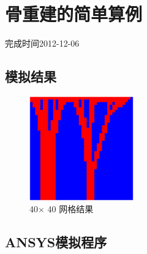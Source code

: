 

\section{骨重建的简单算例}
完成时间2012-12-06
\subsection{模拟结果}
\begin{figure}[htbp]
	\begin{center}
		\includegraphics[width=0.4\textwidth]{pics/40.eps}
	\end{center}
	\caption{40$\times$ 40 网格结果}
	\label{fig:bone}
\end{figure}
\subsection{ANSYS模拟程序}

\newpage
